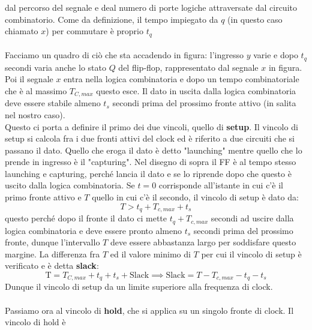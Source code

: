 \documentclass{book}
\begin{document}
        dal percorso del segnale e deal numero di porte logiche attraversate dal circuito combinatorio.
        Come da definizione, il tempo impiegato da $q$ (in questo caso chiamato $x$) per commutare è proprio $t_{q}$
        \\ \\
        Facciamo un quadro di ciò che sta accadendo in figura: l'ingresso $y$ varie e dopo $t_{q}$ secondi
        varia anche lo stato $Q$ del flip-flop, rappresentato dal segnale $x$ in figura. Poi il segnale $x$ entra 
        nella logica combinatoria e dopo un tempo combinatoriale che è al massimo $T_{C,max}$ questo esce. Il dato 
        in uscita dalla logica combinatoria deve essere stabile almeno $t_{s}$ secondi prima del prossimo fronte attivo 
        (in salita nel nostro caso). \\
        Questo ci porta a definire il primo dei due vincoli, quello di \textbf{setup}. Il vincolo di setup 
        si calcola fra i due fronti attivi del clock ed è riferito a due circuiti che si passano il dato. Quello che
        eroga il dato è detto "launching" mentre quello che lo prende in ingresso è il "capturing". Nel
        disegno di sopra il FF è al tempo stesso launching e capturing, perché lancia il dato e se lo riprende dopo che questo
        è uscito dalla logica combinatoria. Se $t=0$ corrisponde all'istante in cui c'è il primo fronte attivo e $T$ quello in cui 
        c'è il secondo, il vincolo di setup è dato da:
        \begin{equation}
            T>t_{q}+T_{c,max}+t_{s}
        \end{equation}
        questo perché dopo il fronte il dato ci mette $t_{q}+T_{c,max}$ secondi ad uscire dalla logica combinatoria e 
        deve essere pronto almeno $t_{s}$ secondi prima del prossimo fronte, dunque l'intervallo $T$ deve essere abbastanza largo 
        per soddisfare questo margine. La differenza fra $T$ ed il valore minimo di $T$ per cui il vincolo di setup è verificato e 
        è detta \textbf{slack}:
        \begin{equation}
            \textrm{T}=T_{C,max}+t_{q}+t_{s}+\textrm{Slack}\implies \textrm{Slack}=T-T_{c,max}-t_{q}-t_{s}
        \end{equation}
        Dunque il vincolo di setup da un limite superiore alla frequenza di clock.
        \\ \\
        Passiamo ora al vincolo di \textbf{hold}, che si applica su un singolo fronte di clock. Il vincolo di hold è 
\end{document}
